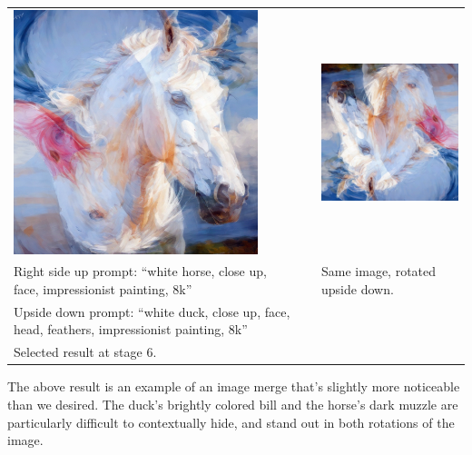 \documentclass[12pt,letterpaper]{article}
\begin{document}
    \noindent\begin{tabular}{ >{\centering}m{2.9in} m{0.18in} >{\centering\arraybackslash}m{2.9in} }
        \includegraphics[width=2.8in]{img_horse_duck_6.png} & & \includegraphics[width=2.8in]{img_horse_duck_6_rotated.png} \\
        Right side up prompt: ``white horse, close up, face, impressionist painting, 8k'' & & Same image, rotated upside down. \\
        Upside down prompt: ``white duck, close up, face, head, feathers, impressionist painting, 8k'' & & \\
        Selected result at stage 6. & & \\
    \end{tabular}

    The above result is an example of an image merge that's slightly more noticeable than we desired. The duck's brightly colored bill and the horse's dark muzzle are particularly difficult to contextually hide, and stand out in both rotations of the image.
\end{document}

